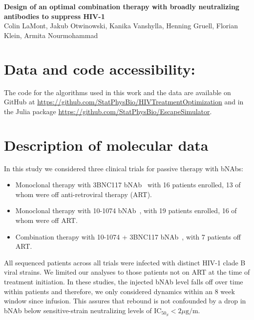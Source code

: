 \documentclass[11pt]{article}
\renewcommand{\paragraph}[2][.]{\noindent {\bf #2#1}}
\begin{document}
\\\\
{\bf Design of an optimal combination therapy with broadly neutralizing antibodies to suppress HIV-1}\vspace{0.1cm}\\
Colin LaMont, Jakub Otwinowski, Kanika Vanshylla, Henning Gruell, Florian Klein, Armita Nourmohammad\\

\renewcommand{\theequation}{S\arabic{equation}} 
\renewcommand{\thetable}{S\arabic{table}}  
\renewcommand{\thefigure}{S\arabic{figure}}

\tableofcontents

\section*{Data and code accessibility:}
The code for the algorithms used in this work and the data are available on GitHub at \url{https://github.com/StatPhysBio/HIVTreatmentOptimization} and in the Julia package  \url{https://github.com/StatPhysBio/EscapeSimulator}.

\section{Description of molecular data}
\paragraph{Data from bNAb trials} In this study we considered three clinical trials for passive therapy with bNAbs:
\begin{itemize}
\item  Monoclonal therapy with 3BNC117  bNAb~\cite{Caskey:2015hm} with 16 patients enrolled, 13 of whom were off   anti-retroviral therapy (ART).
\item Monoclonal therapy with 10-1074 bNAb~\cite{Caskey:2017el}, with 19 patients enrolled, 16 of whom were off ART.
\item Combination therapy with 10-1074 + 3BNC117 bNAb~\cite{bar-onSafetyAntiviralActivity2018}, with 7 patients off ART.
\end{itemize}
All sequenced patients across all trials were infected with  distinct HIV-1 clade B viral strains. We limited our analyses to those patients not on ART at the time of treatment initiation. In these studies, the injected bNAb level falls off over time  within patients and therefore, we only considered dynamics within an 8 week window since infusion. This assures that rebound is not confounded by a drop in bNAb below sensitive-strain neutralizing levels of $\text{IC}_{50_S} < 2 \mu \text{g/m}$.
\end{document}
